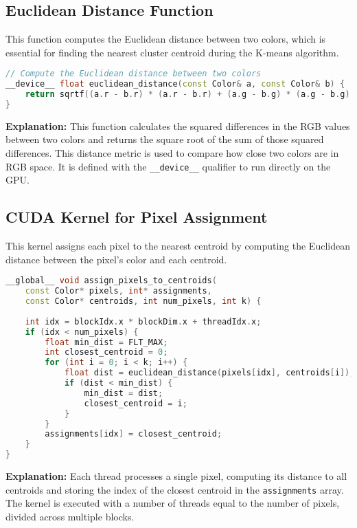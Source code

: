 \subsection{Euclidean Distance Function}
This function computes the Euclidean distance between two colors, which is essential for finding the nearest cluster centroid during the K-means algorithm.

\begin{lstlisting}[language=C++]
// Compute the Euclidean distance between two colors
__device__ float euclidean_distance(const Color& a, const Color& b) {
    return sqrtf((a.r - b.r) * (a.r - b.r) + (a.g - b.g) * (a.g - b.g) + (a.b - b.b) * (a.b - b.b));
}
\end{lstlisting}

\textbf{Explanation:}
This function calculates the squared differences in the RGB values between two colors and returns the square root of the sum of those squared differences. This distance metric is used to compare how close two colors are in RGB space. It is defined with the \texttt{\_\_device\_\_} qualifier to run directly on the GPU.

\subsection{CUDA Kernel for Pixel Assignment}
This kernel assigns each pixel to the nearest centroid by computing the Euclidean distance between the pixel's color and each centroid.

\begin{lstlisting}[language=C++]
__global__ void assign_pixels_to_centroids(
    const Color* pixels, int* assignments, 
    const Color* centroids, int num_pixels, int k) {
    
    int idx = blockIdx.x * blockDim.x + threadIdx.x;
    if (idx < num_pixels) {
        float min_dist = FLT_MAX;
        int closest_centroid = 0;
        for (int i = 0; i < k; i++) {
            float dist = euclidean_distance(pixels[idx], centroids[i]);
            if (dist < min_dist) {
                min_dist = dist;
                closest_centroid = i;
            }
        }
        assignments[idx] = closest_centroid;
    }
}
\end{lstlisting}

\textbf{Explanation:}
Each thread processes a single pixel, computing its distance to all centroids and storing the index of the closest centroid in the \texttt{assignments} array. The kernel is executed with a number of threads equal to the number of pixels, divided across multiple blocks.

